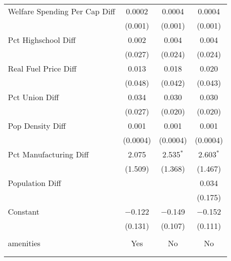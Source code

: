 \begin{table}[!htbp]
\begin{tabular}{@{\extracolsep{5pt}}lccc}
  Welfare Spending Per Cap Diff & 0.0002 & 0.0004 & 0.0004 \\ 
  & (0.001) & (0.001) & (0.001) \\ 
  Pct Highschool Diff & 0.002 & 0.004 & 0.004 \\ 
  & (0.027) & (0.024) & (0.024) \\ 
  Real Fuel Price Diff & 0.013 & 0.018 & 0.020 \\ 
  & (0.048) & (0.042) & (0.043) \\ 
  Pct Union Diff & 0.034 & 0.030 & 0.030 \\ 
  & (0.027) & (0.020) & (0.020) \\ 
  Pop Density Diff & 0.001 & 0.001 & 0.001 \\ 
  & (0.0004) & (0.0004) & (0.0004) \\ 
  Pct Manufacturing Diff & 2.075 & 2.535$^{*}$ & 2.603$^{*}$ \\ 
  & (1.509) & (1.368) & (1.467) \\ 
  Population Diff &  &  & 0.034 \\ 
  &  &  & (0.175) \\ 
  Constant & $-$0.122 & $-$0.149 & $-$0.152 \\ 
  & (0.131) & (0.107) & (0.111) \\ 
 \hline \\[-1.8ex] 
amenities & Yes & No & No \\ 
\hline \\[-1.8ex] 
\hline 
\hline \\[-1.8ex] 
\end{tabular} 
\end{table} 
